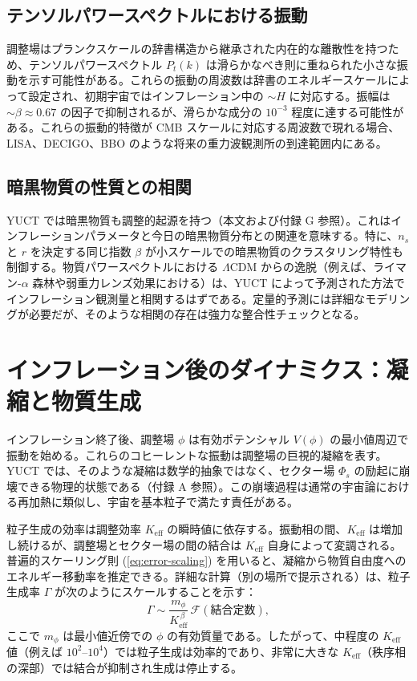 \documentclass[11pt,a4paper]{article}
\theoremstyle{remark}
\newcommand{\Keff}{K_{\mathrm{eff}}}
\begin{document}
	\subsection{テンソルパワースペクトルにおける振動}
	
	調整場はプランクスケールの辞書構造から継承された内在的な離散性を持つため、テンソルパワースペクトル $P_t(k)$ は滑らかなべき則に重ねられた小さな振動を示す可能性がある。これらの振動の周波数は辞書のエネルギースケールによって設定され、初期宇宙ではインフレーション中の $\sim H$ に対応する。振幅は $\sim \beta \approx 0.67$ の因子で抑制されるが、滑らかな成分の $10^{-3}$ 程度に達する可能性がある。これらの振動的特徴が CMB スケールに対応する周波数で現れる場合、LISA、DECIGO、BBO のような将来の重力波観測所の到達範囲内にある。
	
	\subsection{暗黒物質の性質との相関}
	
	YUCT では暗黒物質も調整的起源を持つ（本文および付録 G 参照）。これはインフレーションパラメータと今日の暗黒物質分布との関連を意味する。特に、$n_s$ と $r$ を決定する同じ指数 $\beta$ が小スケールでの暗黒物質のクラスタリング特性も制御する。物質パワースペクトルにおける $\Lambda$CDM からの逸脱（例えば、ライマン-$\alpha$ 森林や弱重力レンズ効果における）は、YUCT によって予測された方法でインフレーション観測量と相関するはずである。定量的予測には詳細なモデリングが必要だが、そのような相関の存在は強力な整合性チェックとなる。
	
	\section{インフレーション後のダイナミクス：凝縮と物質生成}
	\label{sec:postinflation}
	
	インフレーション終了後、調整場 $\phi$ は有効ポテンシャル $V(\phi)$ の最小値周辺で振動を始める。これらのコヒーレントな振動は調整場の巨視的凝縮を表す。YUCT では、そのような凝縮は数学的抽象ではなく、セクター場 $\Phi_s$ の励起に崩壊できる物理的状態である（付録 A 参照）。この崩壊過程は通常の宇宙論における再加熱に類似し、宇宙を基本粒子で満たす責任がある。
	
	粒子生成の効率は調整効率 $\Keff$ の瞬時値に依存する。振動相の間、$\Keff$ は増加し続けるが、調整場とセクター場の間の結合は $\Keff$ 自身によって変調される。普遍的スケーリング則 (\ref{eq:error-scaling}) を用いると、凝縮から物質自由度へのエネルギー移動率を推定できる。詳細な計算（別の場所で提示される）は、粒子生成率 $\Gamma$ が次のようにスケールすることを示す：
	\begin{equation}
		\Gamma \sim \frac{m_\phi}{\Keff^{\,\beta}} \, \mathcal{F}(\text{結合定数}),
		\label{eq:gamma}
	\end{equation}
	ここで $m_\phi$ は最小値近傍での $\phi$ の有効質量である。したがって、中程度の $\Keff$ 値（例えば $10^2$–$10^4$）では粒子生成は効率的であり、非常に大きな $\Keff$（秩序相の深部）では結合が抑制され生成は停止する。
	
\end{document}
